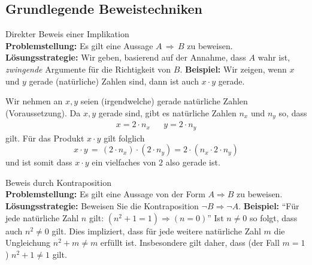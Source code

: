 \subsection{Grundlegende Beweistechniken}

\begin{comment}
    Wir wollen im Folgenden einige der elementarsten Standardbeweistechniken besprechen. Natürlich sollen diese Techniken in etwas komplexeren Beweisen auch beliebig kombiniert werden dürfen. Wir könnten beispielsweise zum Beweis einer Äquivalenz die eine Richtung durch Kontraposition und die andere Richtung direkt oder durch Widerspruch beweisen.    
\end{comment}

\begin{howto}{Direkter Beweis einer Implikation}\\
\textbf{Problemstellung:} Es gilt eine Aussage $A\,\Rightarrow \, B$ zu beweisen.\\
\textbf{Lösungsstrategie:} Wir geben, basierend auf der Annahme, dass $A$ wahr ist, \textit{zwingende} Argumente für die Richtigkeit von $B$.
\tcblower
\textbf{Beispiel:} Wir zeigen, wenn $x$ und $y$ gerade (natürliche) Zahlen sind, dann ist auch $x\cdot y$ gerade.

Wir nehmen an $x,y$ seien (irgendwelche) gerade natürliche Zahlen (Voraussetzung). Da $x,y$ gerade sind, gibt es natürliche Zahlen $n_x$ und $n_y$ so, dass
\begin{align*}
x=2\cdot n_x&&y=2\cdot n_y
\end{align*}
gilt. Für das Produkt $x\cdot y$ gilt folglich
\[
x\cdot y \,=\, (2\cdot n_x)\cdot(2\cdot n_y)=2\cdot(n_x\cdot 2\cdot n_y)
\]
und ist somit dass $x\cdot y$ ein vielfaches von $2$ also gerade ist.
\end{howto}

\begin{howto}{Beweis durch Kontraposition}\\
    \textbf{Problemstellung:} Es gilt eine Aussage von der Form $A\Rightarrow B$ zu beweisen.\\
    \textbf{Lösungsstrategie:} Beweisen Sie die Kontraposition $\neg B\Rightarrow\neg A$.
    \tcblower
    \textbf{Beispiel:} ``Für jede natürliche Zahl $n$ gilt: $(n^2+1=1)\Rightarrow (n=0)$''
Ist $n\neq 0$ so folgt, dass auch $n^2\neq 0$ gilt. Dies impliziert, dass für jede weitere natürliche Zahl $m$ die Ungleichung $n^2+m\neq m$ erfüllt ist. Insbesondere gilt daher, dass (der Fall $m=1$) $n^2+1\neq 1$ gilt.
\end{howto}

